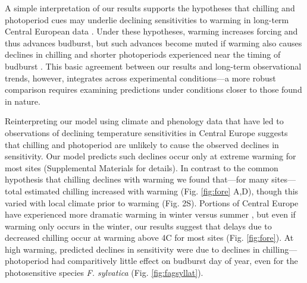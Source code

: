\documentclass{article}
\begin{document}
\par A simple interpretation of our results supports the hypotheses that chilling and photoperiod cues may underlie declining sensitivities to warming in long-term Central European data \citep{Rutishauser:2008,yu2010,fu2015}. Under these hypotheses, warming increases forcing and thus advances budburst, but such advances become muted if warming also causes declines in chilling and shorter photoperiods experienced near the timing of budburst 
\citep{koerner2010a}. %
This basic agreement between our results and long-term observational trends, however, integrates across experimental conditions---a more robust comparison requires examining predictions under conditions closer to those found in nature.


\par Reinterpreting our model using climate and phenology data that have led to observations of declining temperature sensitivities in Central Europe suggests that chilling and photoperiod are unlikely to cause the observed declines in sensitivity. %
Our model predicts such declines occur only at extreme warming for most sites (Supplemental Materials for details). In contrast to the common hypothesis that chilling declines with warming we found that---for many sites---total estimated chilling increased with warming (Fig. \ref{fig:fore} A,D), though this varied with local climate prior to warming (Fig. 2S). 
Portions of Central Europe have experienced more dramatic warming in winter versus summer \citep{balling1998}, but even if warming only occurs in the winter, our results suggest that delays due to decreased chilling occur at warming above 4\degree C for most sites (Fig. \ref{fig:fore}). At high warming, predicted declines in sensitivity were due to declines in chilling---photoperiod had comparitively little effect on budburst day of year, even for the photosensitive species \emph{F. sylvatica} (Fig. \ref{fig:fagsyllat}). 
\end{document}
